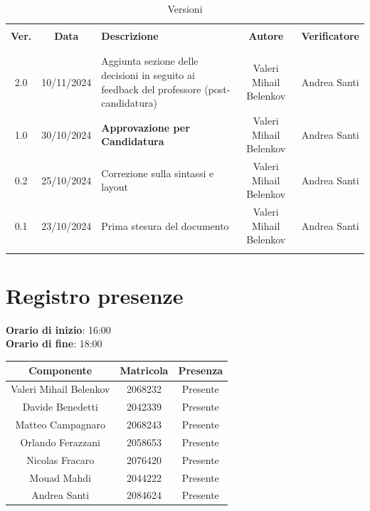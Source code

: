 \documentclass[italian, 12pt]{article}
\begin{document}
\pagestyle{mystyle}


\begin{table}[!h]
	\caption{Versioni}
	\begin{center}
        \fontsize{11.9}{13}\selectfont
		\begin{tabular}{ c c p{6.2cm} c c}
			\hline \\[-2ex]
			\textbf{Ver.} & \textbf{Data} & \textbf{Descrizione} & \textbf{Autore} & \textbf{Verificatore}  \\
			\\[-2ex] \hline \\[-1.5ex]
            2.0 & 10/11/2024 & Aggiunta sezione delle decisioni in seguito ai feedback del professore (post-candidatura) & Valeri Mihail Belenkov & Andrea Santi\\
            1.0 & 30/10/2024 & \textbf{Approvazione per Candidatura} & Valeri Mihail Belenkov & Andrea Santi\\
            0.2 & 25/10/2024 & Correzione sulla sintassi e layout & Valeri Mihail Belenkov & Andrea Santi\\
			0.1 & 23/10/2024 & Prima stesura del documento & Valeri Mihail Belenkov & Andrea Santi\\
			\\[-1.5ex] \hline
		\end{tabular}
	\end{center}
\end{table}


\tableofcontents
\newpage


\section{Registro presenze}

\textbf{Orario di inizio}: 16:00\\
\textbf{Orario di fine}: 18:00\\


\begin{flushleft}
	\begin{table}[!h]
	\begin{tabular}{ |c|c|c| } 
		\hline
		\textbf{Componente} & \textbf{Matricola} & \textbf{Presenza} \\
  \hline 
		Valeri Mihail Belenkov & 2068232 & Presente \\
		Davide Benedetti 	& 2042339 & Presente \\
		Matteo Campagnaro	& 2068243 & Presente \\
		Orlando Ferazzani 	& 2058653 & Presente \\
		Nicolas Fracaro 	& 2076420 & Presente \\
		Mouad Mahdi		    & 2044222 & Presente \\ 
		Andrea Santi 	    & 2084624 & Presente \\
		\hline
	\end{tabular}
	\end{table}
	\end{flushleft}
\end{document}
